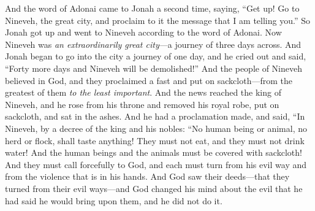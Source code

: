 \begin{biblechapter} %
 And the word of Adonai came to Jonah a second time, saying,
\verse “Get up! Go to Nineveh, the great city, and proclaim to it the message that I am telling you.”
\verse So Jonah got up and went to Nineveh according to the word of Adonai. Now Nineveh was \textit{an extraordinarily great city}—a journey of three days across.
\verse And Jonah began to go into the city a journey of one day, and he cried out and said, “Forty more days and Nineveh will be demolished!”
\verse And the people of Nineveh believed in God, and they proclaimed a fast and put on sackcloth—from the greatest of them \textit{to the least important}.
 And the news reached the king of Nineveh, and he rose from his throne and removed his royal robe, put on sackcloth, and sat in the ashes.
\verse And he had a proclamation made, and said, “In Nineveh, by a decree of the king and his nobles:
\verse “No human being or animal, no herd or flock, shall taste anything! They must not eat, and they must not drink water!
\verse And the human beings and the animals must be covered with sackcloth! And they must call forcefully to God, and each must turn from his evil way and from the violence that is in his hands.
\verse And God saw their deeds—that they turned from their evil ways—and God changed his mind about the evil that he had said he would bring upon them, and he did not do it.
\end{biblechapter}

